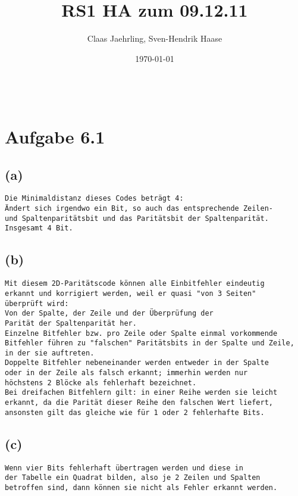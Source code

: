 \documentclass[12pt]{article}
\author{Claas Jaehrling, Sven-Hendrik Haase}
\title{RS1 HA zum 09.12.11}
\date{\today}
\begin{document}
\setcounter{secnumdepth}{0}
\maketitle
\begin{align}
\end{align}


\section{Aufgabe 6.1}
\subsection{(a)}
\begin{verbatim}
Die Minimaldistanz dieses Codes beträgt 4:
Ändert sich irgendwo ein Bit, so auch das entsprechende Zeilen-
und Spaltenparitätsbit und das Paritätsbit der Spaltenparität.
Insgesamt 4 Bit.
\end{verbatim}

\subsection{(b)}
\begin{verbatim}
Mit diesem 2D-Paritätscode können alle Einbitfehler eindeutig
erkannt und korrigiert werden, weil er quasi "von 3 Seiten"
überprüft wird:
Von der Spalte, der Zeile und der Überprüfung der
Parität der Spaltenparität her.
Einzelne Bitfehler bzw. pro Zeile oder Spalte einmal vorkommende 
Bitfehler führen zu "falschen" Paritätsbits in der Spalte und Zeile,
in der sie auftreten.
Doppelte Bitfehler nebeneinander werden entweder in der Spalte
oder in der Zeile als falsch erkannt; immerhin werden nur
höchstens 2 Blöcke als fehlerhaft bezeichnet.
Bei dreifachen Bitfehlern gilt: in einer Reihe werden sie leicht
erkannt, da die Parität dieser Reihe den falschen Wert liefert,
ansonsten gilt das gleiche wie für 1 oder 2 fehlerhafte Bits.
\end{verbatim}

\subsection{(c)}
\begin{verbatim}
Wenn vier Bits fehlerhaft übertragen werden und diese in
der Tabelle ein Quadrat bilden, also je 2 Zeilen und Spalten
betroffen sind, dann können sie nicht als Fehler erkannt werden.
\end{verbatim}
\end{document}
